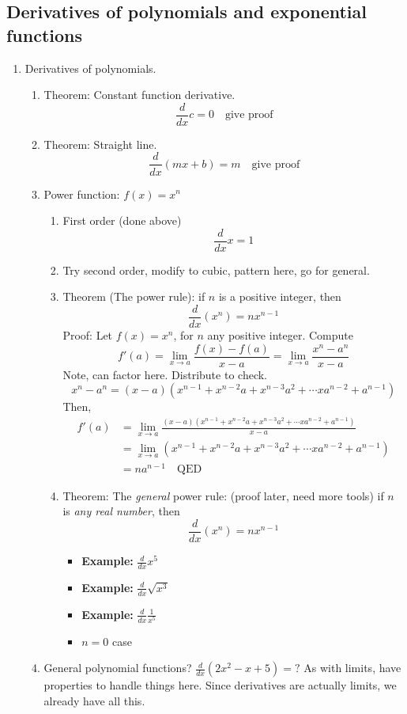 \documentclass{article}
\begin{document}
\subsection{Derivatives of polynomials and exponential functions}
\begin{enumerate}

\item Derivatives of polynomials.
\begin{enumerate}
\item Theorem: Constant function derivative.
$$
\frac{d}{dx} c = 0 \quad \text{give proof}
$$
\item Theorem: Straight line.
$$
\frac{d}{dx} (mx+b) = m \quad \text{give proof}
$$
\item Power function: $f(x)=x^n$
\begin{enumerate}
\item First order (done above)
$$
\frac{d}{dx} x = 1
$$
\item Try second order, modify to cubic, pattern here, go for general.
\item Theorem (The power rule): if $n$ is a positive integer, then
$$
\frac{d}{dx}(x^n)  = nx^{n-1}
$$
Proof: Let $f(x)=x^n$, for $n$ any positive integer. Compute
$$
f'(a) = \lim_{x\rightarrow a} \frac{f(x)-f(a)}{x-a}
= \lim_{x\rightarrow a} \frac{x^n-a^n}{x-a}
$$
Note, can factor here. Distribute to check.
$$
x^n-a^n = (x-a)(x^{n-1} + x^{n-2}a + x^{n-3}a^2 + \cdots xa^{n-2}+a^{n-1})
$$
Then,
\begin{align*}
f'(a) &= \lim_{x\rightarrow a} \frac{(x-a)(x^{n-1} + x^{n-2}a + x^{n-3}a^2 + \cdots xa^{n-2}+a^{n-1})}{x-a} \\
&= \lim_{x\rightarrow a} (x^{n-1} + x^{n-2}a + x^{n-3}a^2 + \cdots xa^{n-2}+a^{n-1}) \\
&= na^{n-1} \quad \text{QED}
\end{align*}
\item Theorem: The \emph{general} power rule: (proof later, need more tools) if $n$ is \emph{any real number}, then
$$
\frac{d}{dx}(x^n)  = nx^{n-1}
$$
\begin{itemize}
\item {\bf Example: } $\frac{d}{dx} x^5$
\item {\bf Example: } $\frac{d}{dx} \sqrt{x^3}$
\item {\bf Example: } $\frac{d}{dx} \frac{1}{x^5}$
\item $n=0$ case
\end{itemize}
\end{enumerate}
\item General polynomial functions? $\frac{d}{dx}(2x^2 - x + 5)=?$ As with limits, have properties to handle things here. Since derivatives are actually limits, we already have all this.
\end{enumerate}


\end{enumerate}
\end{document}
